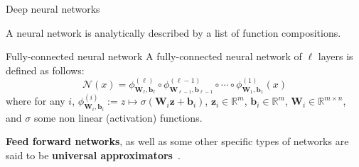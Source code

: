 \documentclass[9pt]{beamer}
\begin{document}
 


\begin{frame}{Deep neural networks}

A neural network is analytically described by a list of function compositions.

\begin{block}{Fully-connected neural network}
    A fully-connected neural network of $\ell$ layers is defined as follows:
    \begin{equation*}
        \mathcal{N}(x) = \phi^{(\ell)}_{\mathbf{W}_\ell,\mathbf{b}_\ell} \circ \phi^{(\ell-1)}_{\mathbf{W}_{\ell-1},\mathbf{b}_{\ell-1}} \circ \cdots \circ \phi^{(1)}_{\mathbf{W}_1,\mathbf{b}_1}(x)
    \end{equation*}
     where for any $i$, $\phi^{(i)}_{\mathbf{W}_i,\mathbf{b}_i} := z \mapsto \sigma(\mathbf{W}_i \mathbf{z} + \mathbf{b}_i)$, $\mathbf{z}_i \in \mathbb{R}^m$, $\mathbf{b}_i \in \mathbb{R}^m$, $\mathbf{W}_i \in \mathbb{R}^{m \times n}$, and $\sigma$ some non linear (activation) functions.
\end{block}
\textbf{Feed forward networks}, as well as some other specific types of networks are said to be \textbf{universal approximators}~\cite{cybenko1989approximation}.
\end{frame}
\end{document}
